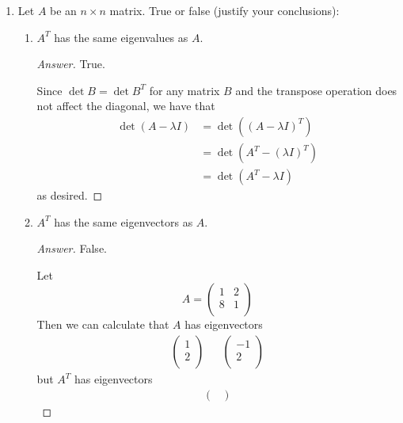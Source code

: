 \documentclass[../psets.tex]{subfiles}
\begin{document}
\begin{enumerate}[label={\textbf{2.\arabic*.}}]
    \item Let $A$ be an $n\times n$ matrix. True or false (justify your conclusions):
    \begin{enumerate}
        \item $A^T$ has the same eigenvalues as $A$.
        \begin{proof}[Answer]
            True.\par
            Since $\det B=\det B^T$ for any matrix $B$ and the transpose operation does not affect the diagonal, we have that
            \begin{align*}
                \det(A-\lambda I) &= \det((A-\lambda I)^T)\\
                &= \det(A^T-(\lambda I)^T)\\
                &= \det(A^T-\lambda I)
            \end{align*}
            as desired.
        \end{proof}
        \item $A^T$ has the same eigenvectors as $A$.
        \begin{proof}[Answer]
            False.\par
            Let
            \begin{equation*}
                A =
                \begin{pmatrix}
                    1 & 2\\
                    8 & 1\\
                \end{pmatrix}
            \end{equation*}
            Then we can calculate that $A$ has eigenvectors
            \begin{align*}
                \begin{pmatrix}
                    1\\
                    2\\
                \end{pmatrix}&&
                \begin{pmatrix}
                    -1\\
                    2\\
                \end{pmatrix}
            \end{align*}
            but $A^T$ has eigenvectors
            \begin{align*}
                \begin{pmatrix}

\end{pmatrix}
\end{align*}
\end{proof}
\end{enumerate}
\end{enumerate}
\end{document}
